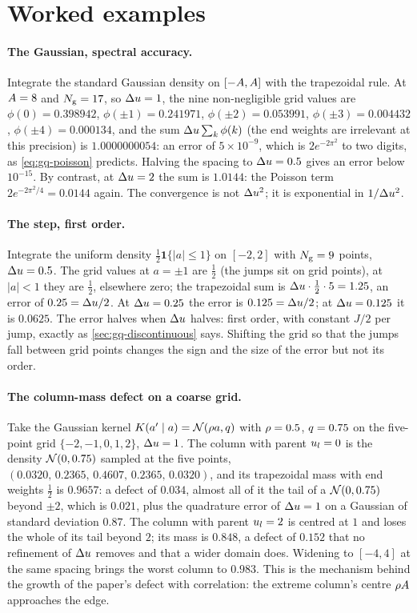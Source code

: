 \section{Worked examples}
\label{sec:gq-example}

\paragraph{The Gaussian, spectral accuracy.}
Integrate the standard Gaussian density on $[-A,A]$ with the
trapezoidal rule. At $A=8$ and $N_{\mathrm{g}}=17$, so $\Delta u=1$, the nine
non-negligible grid values are $\phi(0)=0.398942$, $\phi(\pm1)=0.241971$,
$\phi(\pm2)=0.053991$, $\phi(\pm3)=0.004432$, $\phi(\pm4)=0.000134$, and the sum
$\Delta u\sum_k\phi(k)$ (the end weights are irrelevant at this precision) is
$1.0000000054$: an error of $5\times10^{-9}$, which is $2e^{-2\pi^2}$ to two digits,
as \cref{eq:gq-poisson} predicts. Halving the spacing to $\Delta u=0.5$ gives an error
below $10^{-15}$. By contrast, at $\Delta u=2$ the sum is $1.0144$: the Poisson term
$2e^{-2\pi^2/4}=0.0144$ again. The convergence is not $\Delta u^2$; it is exponential in
$1/\Delta u^2$.

\paragraph{The step, first order.}
Integrate the uniform density $\tfrac12\mathbf 1\{|a|\le1\}$ on $[-2,2]$ with
$N_{\mathrm{g}}=9$ points, $\Delta u=0.5$. The grid values at $a=\pm1$ are $\tfrac12$ (the jumps
sit on grid points), at $|a|<1$ they are $\tfrac12$, elsewhere zero; the trapezoidal
sum is $\Delta u\cdot\tfrac12\cdot5=1.25$, an error of $0.25=\Delta u/2$. At $\Delta u=0.25$
the error is $0.125=\Delta u/2$; at $\Delta u=0.125$ it is $0.0625$. The error halves when
$\Delta u$ halves: first order, with constant $J/2$ per jump, exactly as
\cref{sec:gq-discontinuous} says. Shifting the grid so that the jumps fall between
grid points changes the sign and the size of the error but not its order.

\paragraph{The column-mass defect on a coarse grid.}
Take the Gaussian kernel $K(a'\mid a)=\mathcal{N}\!\left(\rho a,q\right)$ with $\rho=0.5$,
$q=0.75$ on the five-point grid $\{-2,-1,0,1,2\}$, $\Delta u=1$. The column with parent
$u_{l}=0$ is the density $\mathcal{N}\!\left(0,0.75\right)$ sampled at the five points,
$(0.0320,\,0.2365,\,0.4607,\,0.2365,\,0.0320)$, and its trapezoidal mass with end weights
$\tfrac12$ is $0.9657$: a defect of $0.034$, almost all of it the tail of a
$\mathcal{N}\!\left(0,0.75\right)$ beyond $\pm2$, which is $0.021$, plus the quadrature error of
$\Delta u=1$ on a Gaussian of standard deviation $0.87$. The column with parent $u_{l}=2$
is centred at $1$ and loses the whole of its tail beyond $2$; its mass is $0.848$, a
defect of $0.152$ that no refinement of $\Delta u$ removes and that a wider domain does.
Widening to $[-4,4]$ at the same spacing brings the worst column to $0.983$. This is
the mechanism behind the growth of the paper's defect with correlation: the extreme
column's centre $\rho A$ approaches the edge.

